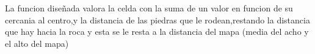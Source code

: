 La funcion diseñada valora la celda con la suma de un valor en funcion de su cercania al centro,y  la distancia de las piedras que le rodean,restando la distancia que hay hacia la roca y esta se le resta a la distancia del mapa (media del acho y el alto del mapa)

